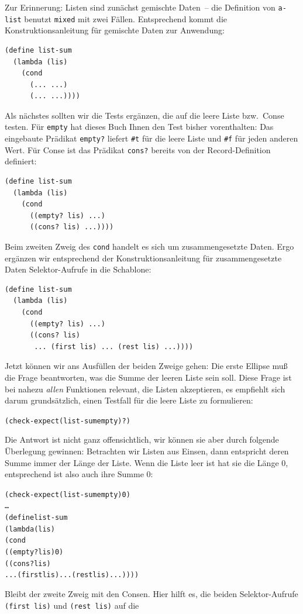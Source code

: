 Zur Erinnerung: Listen sind zunächst gemischte Daten~-- die Definition
von \texttt{a-list} benutzt \texttt{mixed} mit zwei Fällen.  Entsprechend kommt die
Konstruktionsanleitung für gemischte Daten zur Anwendung:
%
\begin{verbatim}
(define list-sum
  (lambda (lis)
    (cond
      (... ...)
      (... ...))))
\end{verbatim}
%
Als nächstes sollten wir die Tests ergänzen, die auf die leere
Liste bzw.\ Conse testen.  Für \texttt{empty} hat dieses Buch Ihnen
den Test bisher vorenthalten: Das eingebaute Prädikat
\texttt{empty?} liefert \verb|#t| für
die leere Liste und \verb|#f| für jeden anderen Wert.  Für Conse ist
das Prädikat \texttt{cons?} bereits von der Record-Definition
definiert:
%
\begin{verbatim}
(define list-sum
  (lambda (lis)
    (cond
      ((empty? lis) ...)
      ((cons? lis) ...))))
\end{verbatim}
%
Beim zweiten Zweig des \texttt{cond} handelt es sich um
zusammengesetzte Daten. Ergo ergänzen wir entsprechend der
Konstruktionsanleitung für zusammengesetzte Daten Selektor-Aufrufe in
die Schablone:
%
\begin{verbatim}
(define list-sum
  (lambda (lis)
    (cond
      ((empty? lis) ...)
      ((cons? lis)
       ... (first lis) ... (rest lis) ...))))
\end{verbatim}
%
Jetzt können wir ans Ausfüllen der beiden Zweige gehen: Die erste
Ellipse muß die Frage beantworten, was die Summe der leeren Liste sein
soll.  Diese Frage ist bei nahezu \emph{allen} Funktionen relevant,
die Listen akzeptieren, es empfiehlt sich darum grundsätzlich, einen
Testfall für die leere Liste zu formulieren:
%
\begin{alltt}
(check-expect (list-sum empty) \textrm{?})
\end{alltt}
%
Die Antwort ist nicht ganz offensichtlich, wir können 
sie aber durch folgende Überlegung gewinnen: Betrachten wir Listen aus
Einsen, dann entspricht deren Summe immer der Länge der Liste.  Wenn
die Liste leer ist hat sie die Länge $0$, entsprechend ist also auch
ihre Summe $0$:
%
\begin{alltt}
(check-expect (list-sum empty) 0)
\ldots
(define list-sum
  (lambda (lis)
    (cond
      ((empty? lis) 0)
      ((cons? lis)
       ... (first lis) ... (rest lis) ...))))
\end{alltt}
%
Bleibt der zweite Zweig mit den Consen.  Hier hilft es, die beiden
Selektor-Aufrufe \texttt{(first lis)} und \texttt{(rest lis)} auf die
